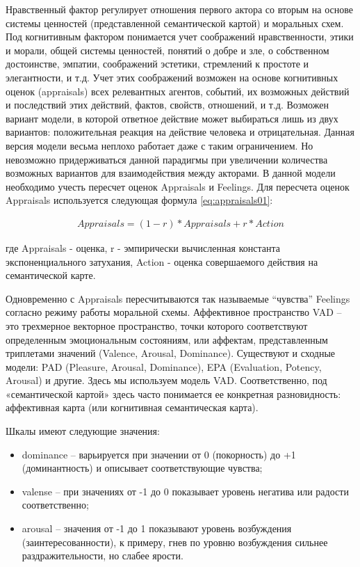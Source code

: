 Нравственный фактор регулирует отношения первого актора со вторым на основе системы ценностей (представленной семантической картой) 
и моральных схем. Под когнитивным фактором понимается учет соображений нравственности, этики и морали, общей системы ценностей, 
понятий о добре и зле, о собственном достоинстве, эмпатии, соображений эстетики, стремлений к простоте и элегантности, и т.д. 
Учет этих соображений возможен на основе когнитивных оценок (appraisals) всех релевантных агентов, событий, их возможных действий 
и последствий этих действий, фактов, свойств, отношений, и т.д. Возможен вариант модели, в которой ответное действие может выбираться 
лишь из двух вариантов: положительная реакция на действие человека и отрицательная. Данная версия модели весьма неплохо работает даже 
с таким ограничением. Но невозможно придерживаться данной парадигмы при увеличении количества возможных вариантов для взаимодействия 
между акторами. В данной модели необходимо учесть пересчет оценок Appraisals и Feelings. Для пересчета оценок Appraisals используется 
следующая формула \ref{eq:appraisals01}:

\begin{equation}
  \begin{gathered}
    Appraisals=(1-r)*Appraisals+r*Action
  \end{gathered}
  \label{eq:appraisals01}
\end{equation}

где Appraisals - оценка, 
r - эмпирически вычисленная константа экспоненциального затухания, 
Action - оценка совершаемого действия на семантической карте.

Одновременно с Appraisals пересчитываются так называемые “чувства” Feelings согласно режиму работы моральной схемы.
Аффективное пространство VAD – это трехмерное векторное пространство, точки которого соответствуют определенным эмоциональным 
состояниям, или аффектам, представленным триплетами значений (Valence, Arousal, Dominance). 
Существуют и сходные модели: PAD (Pleasure, Arousal, Dominance), EPA (Evaluation, Potency, Arousal) и другие. 
Здесь мы используем модель VAD. Соответственно, под «семантической картой» здесь часто понимается ее конкретная 
разновидность: аффективная карта (или когнитивная семантическая карта).

Шкалы имеют следующие значения:
\begin{itemize}
  \item dominance – варьируется при значении от 0 (покорность) до +1 (доминантность) и описывает соответствующие чувства; 
  \item valense – при значениях от -1 до 0 показывает уровень негатива или радости соответственно; 
  \item arousal – значения от -1 до 1 показывают уровень возбуждения (заинтересованности), к примеру, гнев по уровню возбуждения сильнее раздражительности, но слабее ярости. 
\end{itemize}


